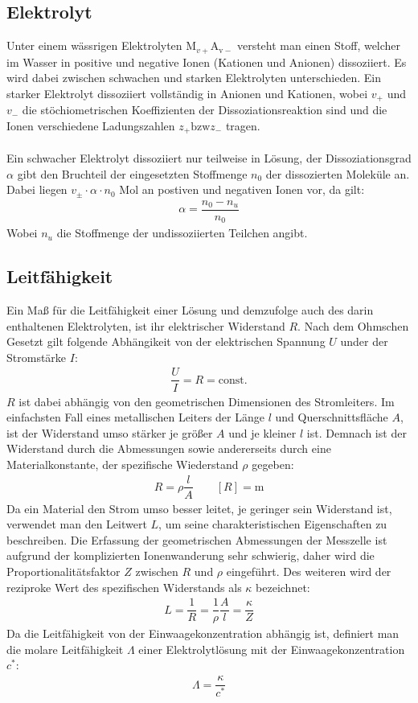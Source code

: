 \documentclass[12pt,a4paper,titlepage,headinclude,bibtotoc]{scrartcl}
\begin{document}
\subsection{Elektrolyt}
Unter einem wässrigen Elektrolyten $\mathrm{M}_{v+}\mathrm{A_{v-}}$ versteht man einen Stoff, welcher im Wasser in positive und negative Ionen (Kationen und Anionen) dissoziiert. Es wird dabei zwischen schwachen und starken Elektrolyten unterschieden. Ein starker Elektrolyt dissoziiert vollständig in Anionen und Kationen, wobei $v_+$ und $v_-$ die stöchiometrischen Koeffizienten der Dissoziationsreaktion sind und die Ionen verschiedene Ladungszahlen $z_+\mathrm{bzw} z_-$ tragen.\\\\
Ein schwacher Elektrolyt dissoziiert nur teilweise in Lösung, der Dissoziationsgrad $\alpha $ gibt den Bruchteil der eingesetzten Stoffmenge $n_0$ der dissozierten Moleküle an. Dabei liegen $v_{\pm } \cdot \alpha \cdot n_0$ Mol an postiven und negativen Ionen vor, da gilt:
\begin{align}
\alpha = \dfrac{n_0 - n_u}{n_0}
\end{align} 
Wobei $n_u$ die Stoffmenge der undissoziierten Teilchen angibt.
\subsection{Leitfähigkeit}
Ein Maß für die Leitfähigkeit einer Lösung und demzufolge auch des darin enthaltenen Elektrolyten, ist ihr elektrischer Widerstand $R$. Nach dem Ohmschen Gesetzt gilt folgende Abhängikeit von der elektrischen Spannung $U$ under der Stromstärke $I$:
\begin{align}
\dfrac{U}{I} = R = \mathrm{const}.
\end{align}
$R$ ist dabei abhängig von den geometrischen Dimensionen des Stromleiters. Im einfachsten Fall eines metallischen Leiters der Länge $l$ und Querschnittsfläche $A$, ist der Widerstand umso stärker je größer $A$ und je kleiner $l$ ist. Demnach ist der Widerstand durch die Abmessungen sowie andererseits durch eine Materialkonstante, der spezifische Wiederstand $\rho $ gegeben:
\begin{align}
R = \rho \dfrac{l}{A} \quad \quad  [R]=  \mathrm{m}
\end{align} 
Da ein Material den Strom umso besser leitet, je geringer sein Widerstand ist, verwendet man den Leitwert $L$, um seine charakteristischen Eigenschaften zu beschreiben. Die Erfassung der geometrischen Abmessungen der Messzelle ist aufgrund der komplizierten Ionenwanderung sehr schwierig, daher wird die Proportionalitätsfaktor $Z$ zwischen $R$ und $\rho$ eingeführt. Des weiteren wird der reziproke Wert des spezifischen Widerstands als $\kappa$ bezeichnet:
\begin{align}
L = \dfrac{1}{R} = \dfrac{1}{\rho } \dfrac{A}{l} = \dfrac{\kappa }{Z}
\end{align} 
Da die Leitfähigkeit von der Einwaagekonzentration abhängig ist, definiert man die molare Leitfähigkeit $\Lambda$ einer Elektrolytlösung mit der Einwaagekonzentration $c^*$:
\begin{align}
\Lambda = \dfrac{\kappa}{c^*}
\end{align}
\end{document}
